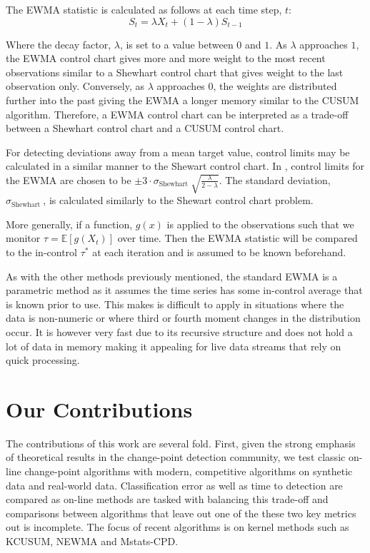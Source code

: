 The EWMA statistic is calculated as follows at each time step, $t$:
$$S_t = \lambda X_t + (1-\lambda)S_{t-1} $$

Where the decay factor,  $\lambda$, is set to a value between $0$ and $1$. As $\lambda$ approaches $1$, the EWMA control chart gives more and more weight to the most recent observations similar to a Shewhart control chart that gives weight to the last observation only. Conversely, as $\lambda$ approaches $0$, the weights are distributed further into the past giving the EWMA a longer memory similar to the CUSUM algorithm. Therefore, a EWMA control chart can be interpreted as a trade-off between a Shewhart control chart and a CUSUM control chart. 

For detecting deviations away from a mean target value, control limits may be calculated in a similar manner to the Shewart control chart. In \cite{hunter1986exponentially}, control limits for the EWMA are chosen to be  $\pm 3 \cdot \sigma_{\text {Shewhart }} \sqrt{\frac{\lambda}{2-\lambda}}$. The standard deviation, $\sigma_{\text {Shewhart }}$, is calculated similarly to the Shewart control chart problem. %

More generally, if a function, $g(x)$ is applied to the observations such that we monitor $\tau= \mathbb{E}[g(X_t)]$ over time. Then the EWMA statistic will be compared to the in-control $\tau^*$ at each iteration and is assumed to be known beforehand.  

As with the other methods previously mentioned, the standard EWMA is a parametric method as it assumes the time series has some in-control average that is known prior to use. This makes is difficult to apply in situations where the data is non-numeric or where third or fourth moment changes in the distribution occur. It is however very fast due to its recursive structure and does not hold a lot of data in memory making it appealing for live data streams that rely on quick processing.


\section{Our Contributions}
The contributions of this work are several fold. First, given the strong emphasis of theoretical results in the change-point detection community, we test classic on-line change-point algorithms with modern, competitive algorithms on synthetic data and real-world data. Classification error as well as time to detection are compared as on-line methods are tasked with balancing this trade-off and comparisons between algorithms that leave out one of the these two key metrics out is incomplete. The focus of recent algorithms is on kernel methods such as KCUSUM, NEWMA and Mstats-CPD. 